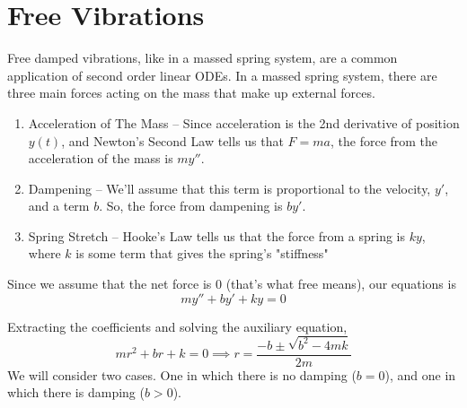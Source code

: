 \section{Free Vibrations}
\noindent
Free damped vibrations, like in a massed spring system, are a common application of second order linear ODEs. In a massed spring system, there are three main forces acting on the mass that make up external forces.
\begin{enumerate}[label=\arabic*)]
	\item Acceleration of The Mass -- Since acceleration is the 2nd derivative of position $y(t)$, and Newton's Second Law tells us that $F = ma$, the force from the acceleration of the mass is $my''$.
	\item Dampening -- We'll assume that this term is proportional to the velocity, $y'$, and a term $b$. So, the force from dampening is $by'$.
	\item Spring Stretch -- Hooke's Law tells us that the force from a spring is $ky$, where $k$ is some term that gives the spring's "stiffness"
\end{enumerate}
Since we assume that the net force is 0 (that's what free means), our equations is
\begin{equation*}
	my'' + by' + ky = 0
\end{equation*}

\noindent
Extracting the coefficients and solving the auxiliary equation,
\begin{equation*}
	mr^2 + br + k = 0 \implies r = \frac{-b \pm \sqrt{b^2 - 4mk}}{2m}
\end{equation*}
We will consider two cases. One in which there is no damping ($b = 0$), and one in which there is damping ($b > 0$).


